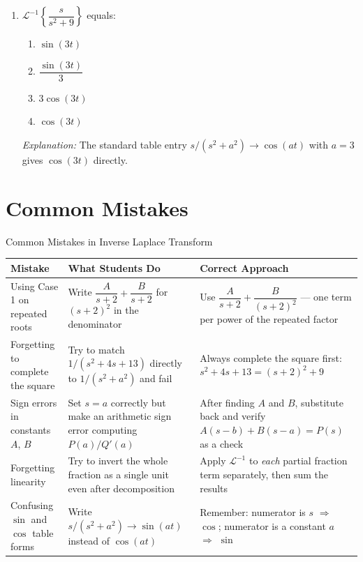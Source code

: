 \documentclass[12pt,a4paper]{article}
\begin{document}
\begin{enumerate}[leftmargin=*, label=\textbf{MCQ \arabic*.}]
\medskip
\item $\mathcal{L}^{-1}\!\left\{\dfrac{s}{s^{2}+9}\right\}$ equals:
\begin{enumerate}[label=(\alph*)]
    \item $\sin(3t)$
    \item $\dfrac{\sin(3t)}{3}$
    \item $3\cos(3t)$
    \item \textbf{$\cos(3t)$}
\end{enumerate}
\textit{Explanation:} The standard table entry $s/(s^{2}+a^{2})\to\cos(at)$
with $a=3$ gives $\cos(3t)$ directly.

\end{enumerate}

\section{Common Mistakes}

\begin{mistakebox}{Common Mistakes in Inverse Laplace Transform}
\begin{tabular}{@{} p{3.5cm} p{5cm} p{5cm} @{}}
\toprule
\textbf{Mistake} & \textbf{What Students Do} & \textbf{Correct Approach} \\
\midrule
Using Case 1 on repeated roots &
    Write $\dfrac{A}{s+2}+\dfrac{B}{s+2}$ for $(s+2)^{2}$ in the denominator &
    Use $\dfrac{A}{s+2}+\dfrac{B}{(s+2)^{2}}$ --- one term per power of the
    repeated factor \\
\midrule
Forgetting to complete the square &
    Try to match $1/(s^{2}+4s+13)$ directly to $1/(s^{2}+a^{2})$ and fail &
    Always complete the square first: $s^{2}+4s+13=(s+2)^{2}+9$ \\
\midrule
Sign errors in constants $A$, $B$ &
    Set $s = a$ correctly but make an arithmetic sign error computing
    $P(a)/Q'(a)$ &
    After finding $A$ and $B$, substitute back and verify $A(s-b)+B(s-a) = P(s)$
    as a check \\
\midrule
Forgetting linearity &
    Try to invert the whole fraction as a single unit even after decomposition &
    Apply $\mathcal{L}^{-1}$ to \emph{each} partial fraction term separately,
    then sum the results \\
\midrule
Confusing $\sin$ and $\cos$ table forms &
    Write $s/(s^{2}+a^{2}) \to \sin(at)$ instead of $\cos(at)$ &
    Remember: numerator is $s$ $\Rightarrow$ $\cos$;
    numerator is a constant $a$ $\Rightarrow$ $\sin$ \\
\bottomrule
\end{tabular}
\end{mistakebox}
\end{document}
